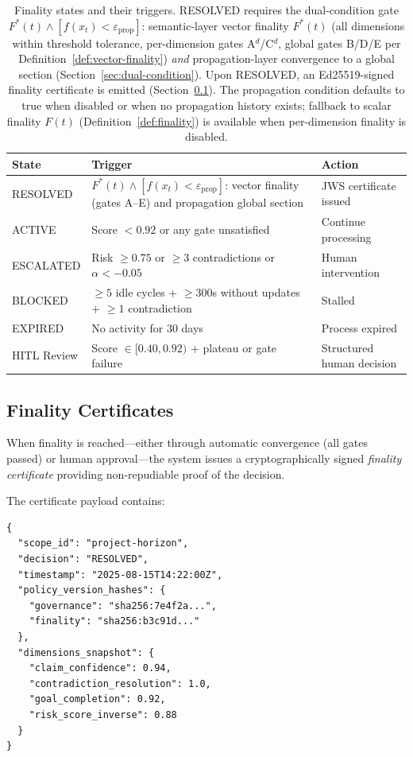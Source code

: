 \documentclass[11pt]{article}
\begin{document}
\begin{table}[H]
\centering
\small
\begin{tabular}{lp{7cm}l}
\toprule
\textbf{State} & \textbf{Trigger} & \textbf{Action} \\
\midrule
RESOLVED & $F^*(t) \wedge [f(x_t) < \varepsilon_{\mathrm{prop}}]$: vector finality (gates A--E) and propagation global section & JWS certificate issued \\
ACTIVE & Score $< 0.92$ or any gate unsatisfied & Continue processing \\
ESCALATED & Risk $\geq 0.75$ or $\geq 3$ contradictions or $\alpha < -0.05$ & Human intervention \\
BLOCKED & $\geq 5$ idle cycles + $\geq 300$s without updates + $\geq 1$ contradiction & Stalled \\
EXPIRED & No activity for 30 days & Process expired \\
HITL Review & Score $\in [0.40, 0.92)$ + plateau or gate failure & Structured human decision \\
\bottomrule
\end{tabular}
\caption{Finality states and their triggers. RESOLVED requires the dual-condition gate $F^*(t) \wedge [f(x_t) < \varepsilon_{\mathrm{prop}}]$:
semantic-layer vector finality $F^*(t)$ (all dimensions within threshold tolerance, per-dimension gates A$^d$/C$^d$, global gates B/D/E per Definition~\ref{def:vector-finality})
\emph{and} propagation-layer convergence to a global section (Section~\ref{sec:dual-condition}).
Upon RESOLVED, an Ed25519-signed finality certificate is emitted (Section~\ref{sec:certificates}).
The propagation condition defaults to true when disabled or when no propagation history exists; fallback to scalar finality $F(t)$ (Definition~\ref{def:finality}) is available when per-dimension finality is disabled.}
\label{tab:finality}
\end{table}

\subsection{Finality Certificates}
\label{sec:certificates}

When finality is reached---either through automatic convergence (all gates passed) or human approval---the system issues a cryptographically signed \emph{finality certificate} providing non-repudiable proof of the decision.

The certificate payload contains:

\begin{lstlisting}
{
  "scope_id": "project-horizon",
  "decision": "RESOLVED",
  "timestamp": "2025-08-15T14:22:00Z",
  "policy_version_hashes": {
    "governance": "sha256:7e4f2a...",
    "finality": "sha256:b3c91d..."
  },
  "dimensions_snapshot": {
    "claim_confidence": 0.94,
    "contradiction_resolution": 1.0,
    "goal_completion": 0.92,
    "risk_score_inverse": 0.88
  }
}
\end{lstlisting}
\end{document}
